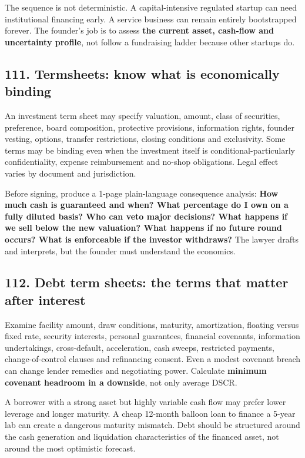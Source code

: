 The sequence is not deterministic. A capital-intensive regulated startup can need institutional financing early. A service business can remain entirely bootstrapped forever. The founder's job is to assess \textbf{the current asset, cash-flow and uncertainty profile}, not follow a fundraising ladder because other startups do.

\subsection{111. Termsheets: know what is economically binding}


An investment term sheet may specify valuation, amount, class of securities, preference, board composition, protective provisions, information rights, founder vesting, options, transfer restrictions, closing conditions and exclusivity. Some terms may be binding even when the investment itself is conditional-particularly confidentiality, expense reimbursement and no-shop obligations. Legal effect varies by document and jurisdiction.

Before signing, produce a 1-page plain-language consequence analysis: \textbf{How much cash is guaranteed and when? What percentage do I own on a fully diluted basis? Who can veto major decisions? What happens if we sell below the new valuation? What happens if no future round occurs? What is enforceable if the investor withdraws?} The lawyer drafts and interprets, but the founder must understand the economics.

\subsection{112. Debt term sheets: the terms that matter after interest}


Examine facility amount, draw conditions, maturity, amortization, floating versus fixed rate, security interests, personal guarantees, financial covenants, information undertakings, cross-default, acceleration, cash sweeps, restricted payments, change-of-control clauses and refinancing consent. Even a modest covenant breach can change lender remedies and negotiating power. Calculate \textbf{minimum covenant headroom in a downside}, not only average DSCR.

A borrower with a strong asset but highly variable cash flow may prefer lower leverage and longer maturity. A cheap 12-month balloon loan to finance a 5-year lab can create a dangerous maturity mismatch. Debt should be structured around the cash generation and liquidation characteristics of the financed asset, not around the most optimistic forecast.

